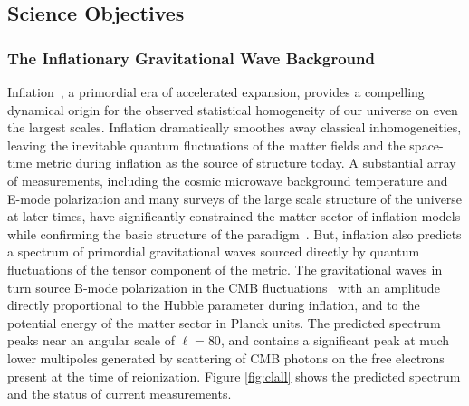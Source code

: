 
\subsection{Science Objectives}
\label{sec:science}

\vspace{-0.05in}


\subsubsection{The Inflationary Gravitational Wave Background}

\vspace{-0.05in}


Inflation~\cite{guth81,linde82,albrecht82,sato81,kolb94}, a primordial era of accelerated expansion, provides a compelling dynamical origin for the observed statistical homogeneity of our universe on even the largest scales. Inflation dramatically smoothes away classical inhomogeneities, leaving the inevitable quantum fluctuations of the matter fields and the space-time metric during inflation as the source of structure today.
A substantial array of measurements, including the cosmic microwave background temperature and E-mode polarization and many surveys of the large scale structure of the universe at later times, have significantly constrained the matter sector of inflation models while confirming the basic structure of the paradigm~\cite{spergel06,Tegmark:2006az,planck2015parameters,planck2015inflation}. But, inflation also predicts a spectrum of primordial gravitational waves sourced directly by quantum fluctuations of the tensor component of the metric. The gravitational waves in turn source B-mode polarization in the CMB fluctuations~\cite{kamionkowski97a,zaldarriaga97} with an amplitude directly proportional to the Hubble parameter during inflation, and to the potential energy of the matter sector in Planck units. The predicted spectrum peaks near an angular scale of $\ell=80$, and contains a significant peak at much lower multipoles generated by scattering of CMB photons on the free electrons present at the time of reionization. Figure \ref{fig:clall} shows the predicted spectrum and the status of current measurements. 

